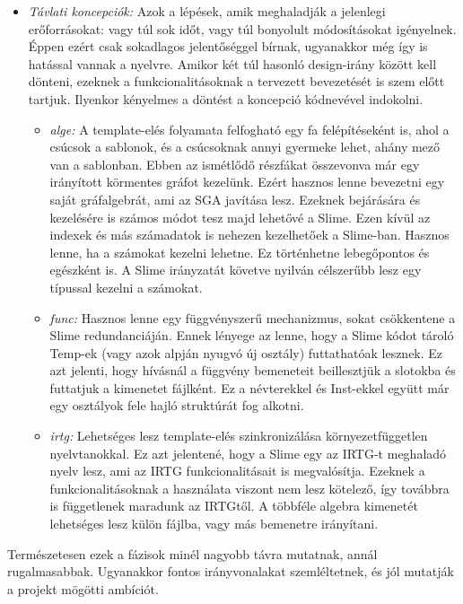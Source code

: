 {\begin{itemize}
\item \emph{Távlati koncepciók:}
Azok a lépések, amik meghaladják a jelenlegi erőforrásokat: vagy túl sok időt, vagy túl bonyolult módosításokat igényelnek.
Éppen ezért csak sokadlagos jelentőséggel bírnak, ugyanakkor még így is hatással vannak a nyelvre.
Amikor két túl hasonló design-irány között kell dönteni, ezeknek a funkcionalitásoknak a tervezett bevezetését is szem előtt tartjuk.
Ilyenkor kényelmes a döntést a koncepció kódnevével indokolni.
\begin{itemize}
\item \emph{alge:}
A template-elés folyamata felfogható egy fa felépítéseként is, ahol a csúcsok a sablonok, és a csúcsoknak annyi gyermeke lehet, ahány mező van a sablonban.
Ebben az ismétlődő részfákat összevonva már egy irányított körmentes gráfot kezelünk.
Ezért hasznos lenne bevezetni egy saját gráfalgebrát, ami az SGA javítása lesz.
Ezeknek bejárására és kezelésére is számos módot tesz majd lehetővé a Slime.
Ezen kívül az indexek és más számadatok is nehezen kezelhetőek a Slime-ban.
Hasznos lenne, ha a számokat kezelni lehetne.
Ez történhetne lebegőpontos és egészként is.
A Slime irányzatát követve nyilván célszerűbb lesz egy típussal kezelni a számokat. 
\item \emph{func:}
Hasznos lenne egy függvényszerű mechanizmus, sokat csökkentene a Slime redundanciáján.
Ennek lényege az lenne, hogy a Slime kódot tároló Temp-ek (vagy azok alpján nyugvó új osztály) futtathatóak lesznek.
Ez azt jelenti, hogy hívásnál a függvény bemeneteit beillesztjük a slotokba és futtatjuk a kimenetet fájlként.
Ez a névterekkel és Inst-ekkel együtt már egy osztályok fele hajló struktúrát fog alkotni.
\item \emph{irtg:}
Lehetséges lesz template-elés szinkronizálása környezetfüggetlen nyelvtanokkal.
Ez azt jelentené, hogy a Slime egy az IRTG-t meghaladó nyelv lesz, ami az IRTG funkcionalitásait is megvalósítja.
Ezeknek a funkcionalitásoknak a használata viszont nem lesz kötelező, így továbbra is függetlenek maradunk az IRTGtől.
A többféle algebra kimenetét lehetséges lesz külön fájlba, vagy más bemenetre irányítani.
\end{itemize}

\end{itemize}

Természetesen ezek a fázisok minél nagyobb távra mutatnak, annál rugalmasabbak.
Ugyanakkor fontos irányvonalakat szemléltetnek, és jól mutatják a projekt mögötti ambíciót.



}
